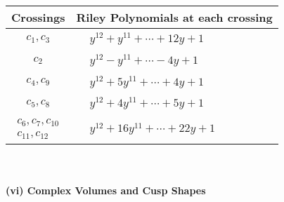 \documentclass[1p]{elsarticle_modified}
\theoremstyle{definition}
\begin{document}
\begin{tabular}{m{50pt}|m{274pt}}
Crossings & \hspace{64pt}Riley Polynomials at each crossing \\
\hline $$\begin{aligned}c_{1},c_{3}\end{aligned}$$&$\begin{aligned}
&y^{12}+y^{11}+\cdots+12 y+1
\end{aligned}$\\
\hline $$\begin{aligned}c_{2}\end{aligned}$$&$\begin{aligned}
&y^{12}- y^{11}+\cdots-4 y+1
\end{aligned}$\\
\hline $$\begin{aligned}c_{4},c_{9}\end{aligned}$$&$\begin{aligned}
&y^{12}+5 y^{11}+\cdots+4 y+1
\end{aligned}$\\
\hline $$\begin{aligned}c_{5},c_{8}\end{aligned}$$&$\begin{aligned}
&y^{12}+4 y^{11}+\cdots+5 y+1
\end{aligned}$\\
\hline $$\begin{aligned}c_{6},c_{7},c_{10}\\c_{11},c_{12}\end{aligned}$$&$\begin{aligned}
&y^{12}+16 y^{11}+\cdots+22 y+1
\end{aligned}$\\
\hline
\end{tabular}\\~\\
\newpage\flushleft \textbf{(vi) Complex Volumes and Cusp Shapes}
\end{document}
